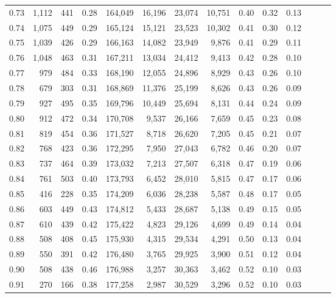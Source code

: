 \begin{tabular}{rrrrrrrrrrrrrr}
0.73 &  1,112 &    441 &  0.28 &  164,049 &   16,196 &  23,074 &  10,751 &  0.40 &  0.32 &      0.13 \\
0.74 &  1,075 &    449 &  0.29 &  165,124 &   15,121 &  23,523 &  10,302 &  0.41 &  0.30 &      0.12 \\
0.75 &  1,039 &    426 &  0.29 &  166,163 &   14,082 &  23,949 &   9,876 &  0.41 &  0.29 &      0.11 \\
0.76 &  1,048 &    463 &  0.31 &  167,211 &   13,034 &  24,412 &   9,413 &  0.42 &  0.28 &      0.10 \\
0.77 &    979 &    484 &  0.33 &  168,190 &   12,055 &  24,896 &   8,929 &  0.43 &  0.26 &      0.10 \\
0.78 &    679 &    303 &  0.31 &  168,869 &   11,376 &  25,199 &   8,626 &  0.43 &  0.26 &      0.09 \\
0.79 &    927 &    495 &  0.35 &  169,796 &   10,449 &  25,694 &   8,131 &  0.44 &  0.24 &      0.09 \\
0.80 &    912 &    472 &  0.34 &  170,708 &    9,537 &  26,166 &   7,659 &  0.45 &  0.23 &      0.08 \\
0.81 &    819 &    454 &  0.36 &  171,527 &    8,718 &  26,620 &   7,205 &  0.45 &  0.21 &      0.07 \\
0.82 &    768 &    423 &  0.36 &  172,295 &    7,950 &  27,043 &   6,782 &  0.46 &  0.20 &      0.07 \\
0.83 &    737 &    464 &  0.39 &  173,032 &    7,213 &  27,507 &   6,318 &  0.47 &  0.19 &      0.06 \\
0.84 &    761 &    503 &  0.40 &  173,793 &    6,452 &  28,010 &   5,815 &  0.47 &  0.17 &      0.06 \\
0.85 &    416 &    228 &  0.35 &  174,209 &    6,036 &  28,238 &   5,587 &  0.48 &  0.17 &      0.05 \\
0.86 &    603 &    449 &  0.43 &  174,812 &    5,433 &  28,687 &   5,138 &  0.49 &  0.15 &      0.05 \\
0.87 &    610 &    439 &  0.42 &  175,422 &    4,823 &  29,126 &   4,699 &  0.49 &  0.14 &      0.04 \\
0.88 &    508 &    408 &  0.45 &  175,930 &    4,315 &  29,534 &   4,291 &  0.50 &  0.13 &      0.04 \\
0.89 &    550 &    391 &  0.42 &  176,480 &    3,765 &  29,925 &   3,900 &  0.51 &  0.12 &      0.04 \\
0.90 &    508 &    438 &  0.46 &  176,988 &    3,257 &  30,363 &   3,462 &  0.52 &  0.10 &      0.03 \\
0.91 &    270 &    166 &  0.38 &  177,258 &    2,987 &  30,529 &   3,296 &  0.52 &  0.10 &      0.03 \\

\end{tabular}
